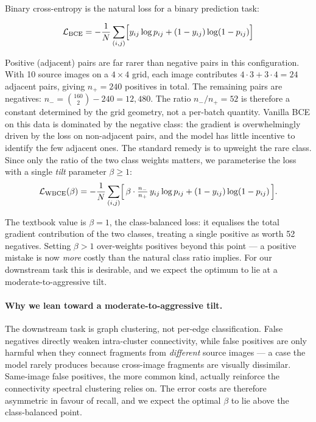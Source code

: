 \documentclass[12pt, a4paper]{article}
\begin{document}
Binary cross-entropy is the natural loss for a binary prediction task:

\[
\mathcal{L}_{\text{BCE}} = -\frac{1}{N}\sum_{(i,j)} \Bigl[ y_{ij} \log p_{ij} + (1 - y_{ij}) \log(1 - p_{ij}) \Bigr]
\]

Positive (adjacent) pairs are far rarer than negative pairs in this configuration.
With 10 source images on a $4 \times 4$ grid, each image contributes
$4 \cdot 3 + 3 \cdot 4 = 24$ adjacent pairs, giving $n_{+} = 240$ positives in
total. The remaining pairs are negatives: $n_{-} = \binom{160}{2} - 240 = 12{,}480$.
The ratio $n_{-}/n_{+} = 52$ is therefore a constant determined by the grid
geometry, not a per-batch quantity. Vanilla BCE on this data is dominated by the
negative class: the gradient is overwhelmingly driven by the loss on non-adjacent
pairs, and the model has little incentive to identify the few adjacent ones. The
standard remedy is to upweight the rare class. Since only the ratio of the two
class weights matters, we parameterise the loss with a single \emph{tilt}
parameter $\beta \geq 1$:
\[
\mathcal{L}_{\text{WBCE}}(\beta) = -\frac{1}{N}\sum_{(i,j)}
    \Bigl[\, \beta \cdot \tfrac{n_{-}}{n_{+}}\, y_{ij} \log p_{ij}
       + (1 - y_{ij}) \log(1 - p_{ij}) \,\Bigr].
\]

The textbook value is $\beta = 1$, the class-balanced loss: it equalises the
total gradient contribution of the two classes, treating a single positive as
worth 52 negatives. Setting $\beta > 1$ over-weights positives beyond this
point --- a positive mistake is now \emph{more} costly than the natural class
ratio implies. For our downstream task this is desirable, and we expect the
optimum to lie at a moderate-to-aggressive tilt.

\paragraph{Why we lean toward a moderate-to-aggressive tilt.}
The downstream task is graph clustering, not per-edge classification. False
negatives directly weaken intra-cluster connectivity, while false positives are
only harmful when they connect fragments from \emph{different} source images ---
a case the model rarely produces because cross-image fragments are visually
dissimilar. Same-image false positives, the more common kind, actually reinforce
the connectivity spectral clustering relies on. The error costs are therefore
asymmetric in favour of recall, and we expect the optimal $\beta$ to lie above
the class-balanced point.
\end{document}
